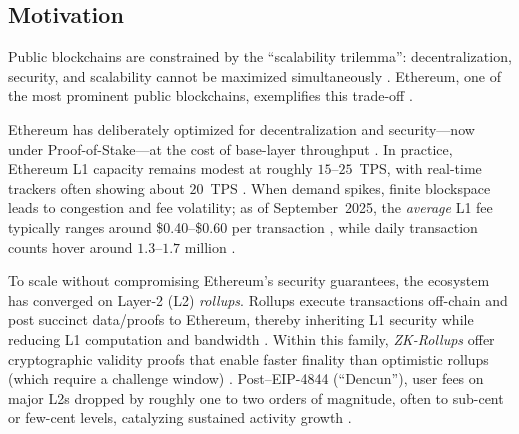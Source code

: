 \vspace{12pt}

\subsection{Motivation}

\vspace{12pt}

Public blockchains are constrained by the ``scalability trilemma'': decentralization, security, and scalability cannot be maximized simultaneously \cite{aldoubaee2024systematic}. Ethereum, one of the most prominent public blockchains, exemplifies this trade-off \cite{zhou2020survey}. 

\vspace{12pt}

Ethereum has deliberately optimized for decentralization and security---now under Proof-of-Stake---at the cost of base-layer throughput \cite{buterin2014ethereum}. In practice, Ethereum L1 capacity remains modest at roughly $15$--$25$~TPS, with real-time trackers often showing about $20$~TPS \cite{chainspect_eth_tps,chainspect_eth_page}. When demand spikes, finite blockspace leads to congestion and fee volatility; as of September~2025, the \emph{average} L1 fee typically ranges around \$0.40--\$0.60 per transaction \cite{ycharts_avgfee2025,bitinfocharts_eth_fee}, while daily transaction counts hover around $1.3$--$1.7$ million \cite{ycharts_eth_tx_per_day,bitinfocharts_eth_tx_per_day}.

\vspace{12pt}

To scale without compromising Ethereum's security guarantees, the ecosystem has converged on Layer-2 (L2) \emph{rollups}. Rollups execute transactions off-chain and post succinct data/proofs to Ethereum, thereby inheriting L1 security while reducing L1 computation and bandwidth \cite{vitalik_serenity,eth_scaling,eth_zk_rollups,eth_optimistic_rollups}. Within this family, \emph{ZK-Rollups} offer cryptographic validity proofs that enable faster finality than optimistic rollups (which require a challenge window) \cite{eth_zk_rollups,eth_optimistic_rollups}. Post--EIP-4844 (``Dencun''), user fees on major L2s dropped by roughly one to two orders of magnitude, often to sub-cent or few-cent levels, catalyzing sustained activity growth \cite{cointelegraph_dencun_fees,theblock_dencun_fees,galaxy_150d_dencun}.

\vspace{12pt}

